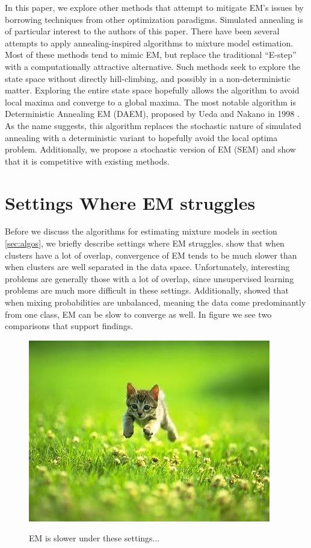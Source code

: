 \documentclass{article}
\theoremstyle{definition}
\theoremstyle{algodesc}
\begin{document}
In this paper, we explore other methods that attempt to mitigate EM's issues by borrowing techniques from other optimization paradigms. Simulated annealing \cite{kirkpatrickgelattvecchi83} is of particular interest to the authors of this paper. There have been several attempts to apply annealing-inspired algorithms to mixture model estimation. Most of these methods tend to mimic EM, but replace the traditional ``E-step'' with a computationally attractive alternative. Such methods seek to explore the state space without directly hill-climbing, and possibly in a non-deterministic matter. Exploring the entire state space hopefully allows the algorithm to avoid local maxima and converge to a global maxima. The most notable algorithm is Deterministic Annealing EM (DAEM), proposed by Ueda and Nakano in 1998 \cite{uedanakano98}. As the name suggests, this algorithm replaces the stochastic nature of simulated annealing with a deterministic variant to hopefully avoid the local optima problem. Additionally, we propose a stochastic version of EM (SEM) and show that it is competitive with existing methods.


\section{Settings Where EM struggles}

Before we discuss the algorithms for estimating mixture models in section \ref{sec:algos}, we briefly describe settings where EM struggles. \cite{uedanakano98} show that when clusters have a lot of overlap, convergence of EM tends to be much slower than when clusters are well separated in the data space. Unfortunately, interesting problems are generally those with a lot of overlap, since unsupervised learning problems are much more difficult in these settings. Additionally, \cite{uedanakano98} showed that when mixing probabilities are unbalanced, meaning the data come predominantly from one class, EM can be slow to converge as well. In figure we see two comparisons that support \cite{uedanakano98} findings.


\begin{figure}[ht]
   \centering
   \includegraphics[width=.5\textwidth]{kitten.png}
   \label{em}
   \caption{EM is slower under these settings...}
\end{figure}
\end{document}
